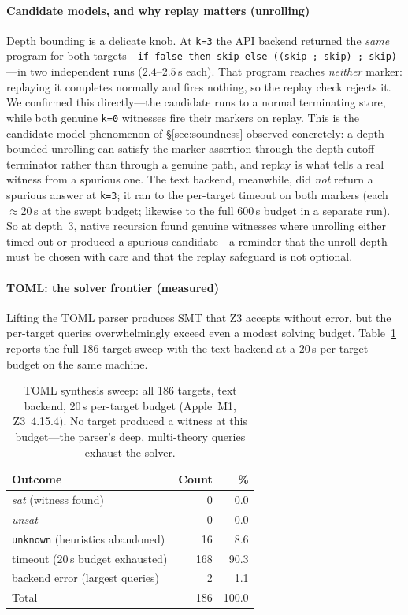 \documentclass[sigplan,review,anonymous]{acmart}
\theoremstyle{definition}
\theoremstyle{remark}
\newcommand{\toml}{TOML}
\newcommand{\code}[1]{\texttt{#1}}
\begin{document}
\paragraph{Candidate models, and why replay matters (unrolling)}
Depth bounding is a delicate knob. At \code{k=3} the API backend returned the
\emph{same} program for both targets---\code{if false then skip else ((skip ;
skip) ; skip)}---in two independent runs ($2.4$--$2.5$\,s each). That program
reaches \emph{neither} marker: replaying it completes normally and fires nothing,
so the replay check rejects it. We confirmed this directly---the candidate runs to
a normal terminating store, while both genuine \code{k=0} witnesses fire their
markers on replay. This is the candidate-model phenomenon of
\S\ref{sec:soundness} observed concretely: a depth-bounded unrolling can satisfy
the marker assertion through the depth-cutoff terminator rather than through a
genuine path, and replay is what tells a real witness from a spurious one. The
text backend, meanwhile, did \emph{not} return a spurious answer at \code{k=3}; it
ran to the per-target timeout on both markers (each $\approx$20\,s at the swept
budget; likewise to the full 600\,s budget in a separate run). So at depth~3,
native recursion found genuine witnesses where unrolling either timed out or
produced a spurious candidate---a reminder that the unroll depth must be chosen
with care and that the replay safeguard is not optional.

\paragraph{\toml{}: the solver frontier (measured)}
Lifting the \toml{} parser produces SMT that Z3 accepts without error, but the
per-target queries overwhelmingly exceed even a modest solving budget.
Table~\ref{tab:toml} reports the full 186-target sweep with the text backend at a
20\,s per-target budget on the same machine.

\begin{table}[t]
\centering
\caption{\toml{} synthesis sweep: all 186 targets, text backend, 20\,s
per-target budget (Apple~M1, Z3~4.15.4). No target produced a witness at this
budget---the parser's deep, multi-theory queries exhaust the solver.}
\label{tab:toml}
\small
\setlength{\tabcolsep}{6pt}
\begin{tabular}{@{}lrr@{}}
\toprule
Outcome & Count & \%\\
\midrule
\emph{sat} (witness found)            & 0   & 0.0\\
\emph{unsat}                          & 0   & 0.0\\
\code{unknown} (heuristics abandoned) & 16  & 8.6\\
timeout (20\,s budget exhausted)      & 168 & 90.3\\
backend error (largest queries)       & 2   & 1.1\\
\midrule
Total                                 & 186 & 100.0\\
\bottomrule
\end{tabular}
\end{table}
\end{document}
